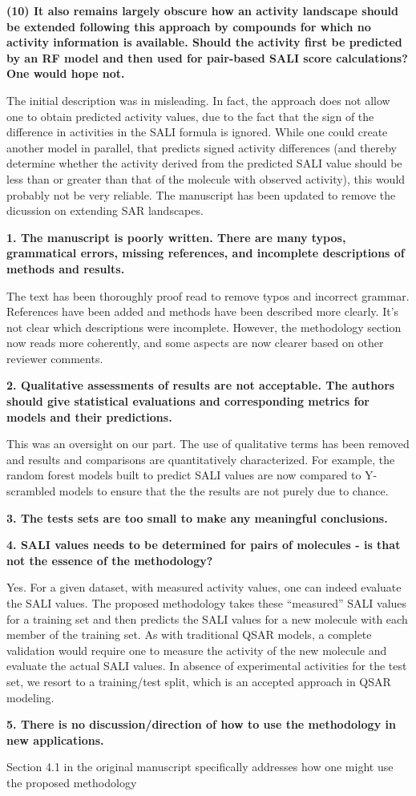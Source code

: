 \documentclass[letterpaper, 12pt]{article}
\begin{document}
\textbf{(10) It also remains largely obscure how an activity landscape should be extended following
  this approach by compounds for which no activity information is available. Should the activity
  first be predicted by an RF model and then used for pair-based SALI score calculations?  One would
  hope not.}

The initial description was in misleading. In fact, the approach does not allow one to obtain
predicted activity values, due to the fact that the sign of the difference in activities in the SALI
formula is ignored. While one could create another model in parallel, that predicts signed activity
differences (and thereby determine whether the activity derived from the predicted SALI value should
be less than or greater than that of the molecule with observed activity), this would probably not
be very reliable. The manuscript has been updated to remove the dicussion on extending SAR
landscapes.


\textbf{1.  The manuscript is poorly written.  There are many typos, grammatical errors, missing
  references, and incomplete descriptions of methods and results.}

The text has been thoroughly proof read to remove typos and incorrect grammar. References have been
added and methods have been described more clearly. It's not clear which descriptions were
incomplete. However, the methodology section now reads more coherently, and some aspects are now
clearer based on other reviewer comments.

\textbf{2.  Qualitative assessments of results are not acceptable.  The authors should give
  statistical evaluations and corresponding metrics for models and their predictions.}

This was an oversight on our part. The use of qualitative terms has been removed and results and
comparisons are quantitatively characterized. For example, the random forest models built to predict
SALI values are now compared to Y-scrambled models to ensure that the the results are not purely due
to chance.

\textbf{3.  The tests sets are too small to make any meaningful conclusions.}

\textbf{4.  SALI values needs to be determined for pairs of molecules - is that not the essence of
  the methodology?}

Yes. For a given dataset, with measured activity values, one can indeed evaluate the SALI
values. The proposed methodology takes these ``measured'' SALI values for a training set and then
predicts the SALI values for a new molecule with each member of the training set. As with
traditional QSAR models, a complete validation would require one to measure the activity of the new
molecule and evaluate the actual SALI values. In absence of experimental activities for the test
set, we resort to a training/test split, which is an accepted approach in QSAR modeling.

\textbf{5.  There is no discussion/direction of how to use the methodology in new applications.}

Section 4.1 in the original manuscript specifically addresses how one might use the proposed
methodology
\end{document}
